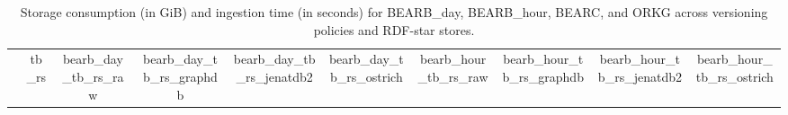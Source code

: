 \begin{table}
\begin{tabular}{p{}c|cccc|cccc}
    \multicolumn{1}{c|}{}  
    & tb\_rs 
    & {{bearb_day_tb_rs_raw}} & {{bearb_day_tb_rs_graphdb}} & {{bearb_day_tb_rs_jenatdb2}} & {{bearb_day_tb_rs_ostrich}}
    & {{bearb_hour_tb_rs_raw}} & {{bearb_hour_tb_rs_graphdb}} & {{bearb_hour_tb_rs_jenatdb2}} & {{bearb_hour_tb_rs_ostrich}} \\

\end{tabular}

\caption{Storage consumption (in GiB) and ingestion time (in seconds) for BEARB\_day, BEARB\_hour, BEARC, and ORKG across versioning policies and RDF-star stores.}
\label{tab:eval_results_storage}
\end{table}

